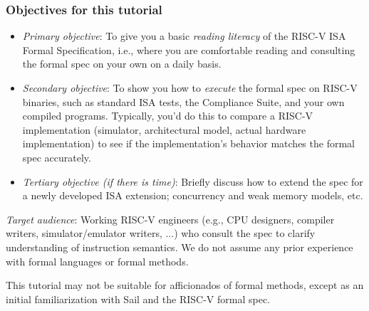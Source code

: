 \documentclass[aspectratio=169]{beamer}
\newcommand{\slidefont}{\scriptsize}
\begin{document}

\begin{frame}[fragile]
  \frametitle{Objectives for this tutorial}

  \slidefont

  \begin{itemize}
    \item \emph{Primary objective}: To give you a basic \emph{reading
      literacy} of the RISC-V ISA Formal Specification, i.e., where
      you are comfortable reading and consulting the formal spec on
      your own on a daily basis.

    \item \emph{Secondary objective}: To show you how to \emph{execute} the
      formal spec on RISC-V binaries, such as standard ISA tests, the
      Compliance Suite, and your own compiled programs.  Typically,
      you'd do this to compare a RISC-V implementation (simulator,
      architectural model, actual hardware implementation) to see if
      the implementation's behavior matches the formal spec
      accurately.

    \item \emph{Tertiary objective (if there is time)}: Briefly
      discuss how to extend the spec for a newly developed ISA
      extension; concurrency and weak memory models, etc.
 \end{itemize}

\vspace{1ex}

 \emph{Target audience}: Working RISC-V engineers (e.g., CPU
 designers, compiler writers, simulator/emulator writers, ...) who
 consult the spec to clarify understanding of instruction semantics.
 We do not assume any prior experience with formal languages or formal
 methods.

 \vspace{2ex}

 This tutorial may not be suitable for afficionados of formal methods,
 except as an initial familiarization with Sail and the RISC-V formal
 spec.

\end{frame}

\end{document}
